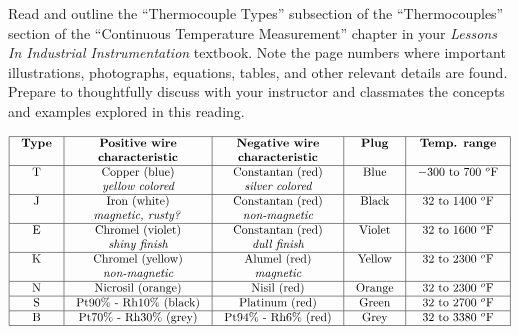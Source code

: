 

Read and outline the ``Thermocouple Types'' subsection of the ``Thermocouples'' section of the ``Continuous Temperature Measurement'' chapter in your {\it Lessons In Industrial Instrumentation} textbook.  Note the page numbers where important illustrations, photographs, equations, tables, and other relevant details are found.  Prepare to thoughtfully discuss with your instructor and classmates the concepts and examples explored in this reading.















$$\vbox{\offinterlineskip
\halign{\strut
\vrule \quad\hfil # \ \hfil & 
\vrule \quad\hfil # \ \hfil & 
\vrule \quad\hfil # \ \hfil & 
\vrule \quad\hfil # \ \hfil & 
\vrule \quad\hfil # \ \hfil \vrule \cr
\noalign{\hrule}
%
{\bf Type} & {\bf Positive wire} & {\bf Negative wire} & {\bf Plug} & {\bf Temp. range} \cr
     & {\bf characteristic} & {\bf characteristic} &  & \cr
%
\noalign{\hrule}
%
T & Copper (blue) & Constantan (red) & Blue & $-300$ to 700 $^{o}$F \cr
  & {\it yellow colored} & {\it silver colored} &  &  \cr
%
\noalign{\hrule}
%
J & Iron (white) & Constantan (red) & Black & 32 to 1400 $^{o}$F \cr
  & {\it magnetic, rusty?} & {\it non-magnetic} &  &  \cr
%
\noalign{\hrule}
%
E & Chromel (violet) & Constantan (red) & Violet & 32 to 1600 $^{o}$F \cr
  & {\it shiny finish} & {\it dull finish} &  &  \cr
%
\noalign{\hrule}
%
K & Chromel (yellow) & Alumel (red) & Yellow & 32 to 2300 $^{o}$F \cr
  & {\it non-magnetic} & {\it magnetic} &  &  \cr
%
\noalign{\hrule}
%
N & Nicrosil (orange) & Nisil (red) & Orange & 32 to 2300 $^{o}$F \cr
%
\noalign{\hrule}
%
S & Pt90\% - Rh10\% (black) & Platinum (red) & Green & 32 to 2700 $^{o}$F \cr
%
\noalign{\hrule}
%
B & Pt70\% - Rh30\% (grey) & Pt94\% - Rh6\% (red) & Grey & 32 to 3380 $^{o}$F \cr
%
\noalign{\hrule}
} %
}$$ %

